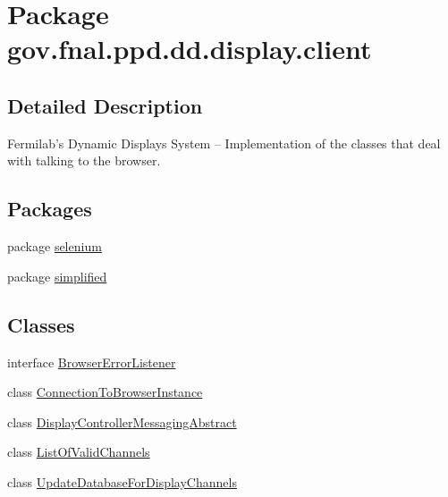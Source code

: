 \hypertarget{namespacegov_1_1fnal_1_1ppd_1_1dd_1_1display_1_1client}{\section{Package gov.\-fnal.\-ppd.\-dd.\-display.\-client}
\label{namespacegov_1_1fnal_1_1ppd_1_1dd_1_1display_1_1client}
}


\subsection{Detailed Description}
Fermilab's Dynamic Displays System -- Implementation of the classes that deal with talking to the browser.\subsection*{Packages}
\begin{DoxyCompactItemize}
\item 
package \hyperlink{namespacegov_1_1fnal_1_1ppd_1_1dd_1_1display_1_1client_1_1selenium}{selenium}
\item 
package \hyperlink{namespacegov_1_1fnal_1_1ppd_1_1dd_1_1display_1_1client_1_1simplified}{simplified}
\end{DoxyCompactItemize}
\subsection*{Classes}
\begin{DoxyCompactItemize}
\item 
interface \hyperlink{interfacegov_1_1fnal_1_1ppd_1_1dd_1_1display_1_1client_1_1BrowserErrorListener}{Browser\-Error\-Listener}
\item 
class \hyperlink{classgov_1_1fnal_1_1ppd_1_1dd_1_1display_1_1client_1_1ConnectionToBrowserInstance}{Connection\-To\-Browser\-Instance}
\item 
class \hyperlink{classgov_1_1fnal_1_1ppd_1_1dd_1_1display_1_1client_1_1DisplayControllerMessagingAbstract}{Display\-Controller\-Messaging\-Abstract}
\item 
class \hyperlink{classgov_1_1fnal_1_1ppd_1_1dd_1_1display_1_1client_1_1ListOfValidChannels}{List\-Of\-Valid\-Channels}
\item 
class \hyperlink{classgov_1_1fnal_1_1ppd_1_1dd_1_1display_1_1client_1_1UpdateDatabaseForDisplayChannels}{Update\-Database\-For\-Display\-Channels}
\end{DoxyCompactItemize}
